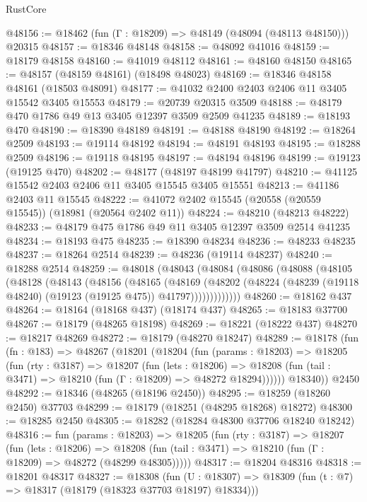\begin{lexlean}{RustCore}
\begin{coremodule}
@48156 := @18462 (fun (Γ : @18209) => @48149 (@48094 (@48113 @48150))) @20315
@48157 := @18346 @48148
@48158 := @48092 @41016
@48159 := @18179 @48158
@48160 := @41019 @48112
@48161 := @48160 @48150
@48165 := @48157 (@48159 @48161) (@18498 @48023)
@48169 := @18346 @48158 @48161 (@18503 @48091)
@48177 := @41032 @2400 @2403 @2406 @11 @3405 @15542 @3405 @15553
@48179 := @20739 @20315 @3509
@48188 := @48179 @470 @1786 @49 @13 @3405 @12397 @3509 @2509 @41235
@48189 := @18193 @470
@48190 := @18390 @48189
@48191 := @48188 @48190
@48192 := @18264 @2509
@48193 := @19114 @48192
@48194 := @48191 @48193
@48195 := @18288 @2509
@48196 := @19118 @48195
@48197 := @48194 @48196
@48199 := @19123 (@19125 @470)
@48202 := @48177 (@48197 @48199 @41797)
@48210 := @41125 @15542 @2403 @2406 @11 @3405 @15545 @3405 @15551
@48213 := @41186 @2403 @11 @15545
@48222 := @41072 @2402 @15545 (@20558 (@20559 @15545)) (@18981 (@20564 @2402 @11))
@48224 := @48210 (@48213 @48222)
@48233 := @48179 @475 @1786 @49 @11 @3405 @12397 @3509 @2514 @41235
@48234 := @18193 @475
@48235 := @18390 @48234
@48236 := @48233 @48235
@48237 := @18264 @2514
@48239 := @48236 (@19114 @48237)
@48240 := @18288 @2514
@48259 := @48018
    (@48043
      (@48084
        (@48086
          (@48088
            (@48105
              (@48128
                (@48143
                  (@48156
                    (@48165
                      (@48169
                        (@48202
                          (@48224 (@48239 (@19118 @48240) (@19123 (@19125 @475)) @41797)))))))))))))
@48260 := @18162 @437
@48264 := @18164 (@18168 @437) (@18174 @437)
@48265 := @18183 @37700
@48267 := @18179 (@48265 @18198)
@48269 := @18221 (@18222 @437)
@48270 := @18217 @48269
@48272 := @18179 (@48270 @18247)
@48289 := @18178
    (fun (fn : @183) =>
    @48267
      (@18201
        (@18204
          (fun (params : @18203) =>
          @18205
            (fun (rty : @3187) =>
            @18207
              (fun (lets : @18206) =>
              @18208 (fun (tail : @3471) => @18210 (fun (Γ : @18209) => @48272 @18294))))))
        @18340))
    @2450
@48292 := @18346 (@48265 (@18196 @2450))
@48295 := @18259 (@18260 @2450) @37703
@48299 := @18179 (@18251 (@48295 @18268) @18272)
@48300 := @18285 @2450
@48305 := @18282 (@18284 @48300 @37706 @18240 @18242)
@48316 := fun (params : @18203) =>
  @18205
    (fun (rty : @3187) =>
    @18207
      (fun (lets : @18206) =>
      @18208 (fun (tail : @3471) => @18210 (fun (Γ : @18209) => @48272 (@48299 @48305)))))
@48317 := @18204 @48316
@48318 := @18201 @48317
@48327 := @18308
    (fun (U : @18307) => @18309 (fun (t : @7) => @18317 (@18179 (@18323 @37703 @18197) @18334)))

\end{coremodule}
\end{lexlean}
